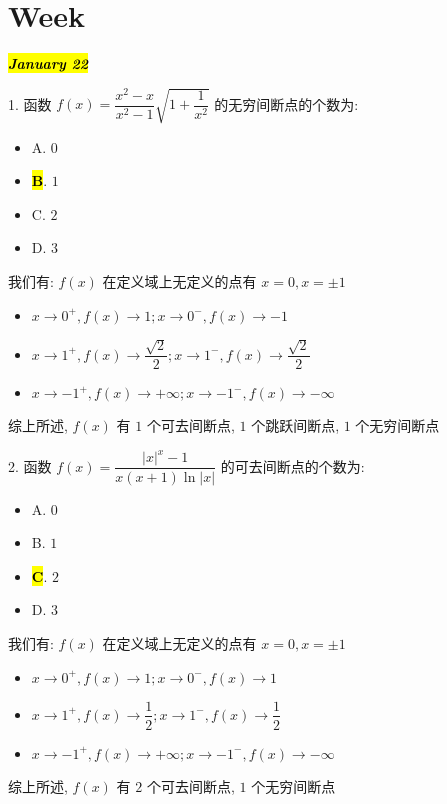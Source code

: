 \section{Week }
\hl{\textbf{\textit{January 22}}}

1. 函数 $f(x)=\dfrac{x^{2}-x}{x^{2}-1}\sqrt{1+\dfrac{1}{x^{2}}}$ 的无穷间断点的个数为:
\begin{itemize}
	\item A. $0$
	\item \hl{\textbf{B}}. $1$
	\item C. $2$
	\item D. $3$
\end{itemize}
\begin{solution}

	我们有: $f(x)$ 在定义域上无定义的点有 $x=0, x=\pm 1$
	\begin{itemize}
		\item $x\to 0^{+}, f(x)\to 1 ; x\to 0^{-}, f(x)\to -1$
		\item $x\to 1^{+}, f(x)\to \dfrac{\sqrt{2}}{2} ; x\to 1^{-}, f(x)\to \dfrac{\sqrt{2}}{2}$
		\item $x\to -1^{+}, f(x)\to +\infty ; x\to -1^{-}, f(x)\to -\infty$
	\end{itemize}

	综上所述, $f(x)$ 有 $1$ 个可去间断点, $1$ 个跳跃间断点, $1$ 个无穷间断点
\end{solution}

2. 函数 $f(x)=\dfrac{|x|^{x}-1}{x(x+1)\ln|x|}$ 的可去间断点的个数为:
\begin{itemize}
	\item A. $0$
	\item B. $1$
	\item \hl{\textbf{C}}. $2$
	\item D. $3$
\end{itemize}
\begin{solution}

	我们有: $f(x)$ 在定义域上无定义的点有 $x=0, x=\pm 1$
	\begin{itemize}
		\item $x\to 0^{+}, f(x)\to 1 ; x\to 0^{-}, f(x)\to 1$
		\item $x\to 1^{+}, f(x)\to \dfrac{1}{2} ; x\to 1^{-}, f(x)\to \dfrac{1}{2}$
		\item $x\to -1^{+}, f(x)\to +\infty ; x\to -1^{-}, f(x)\to -\infty$
	\end{itemize}

	综上所述, $f(x)$ 有 $2$ 个可去间断点, $1$ 个无穷间断点
\end{solution}

